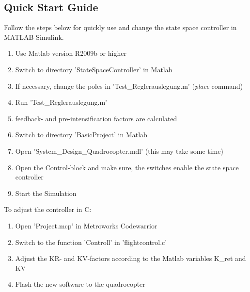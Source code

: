 \subsection{Quick Start Guide}\label{chapter_QSG}

Follow the steps below for quickly use and change the state space controller in MATLAB Simulink.

\begin{enumerate}
	\item Use Matlab version R2009b or higher
	\item Switch to directory 'StateSpaceController' in Matlab
	\item If necessary, change the poles in 'Test\_Reglerauslegung.m' (\textit{place} command)
	\item Run 'Test\_Reglerauslegung.m'
	\item feedback- and pre-intensification factors are calculated
	\item Switch to directory 'BasicProject' in Matlab
	\item Open 'System\_Design\_Quadrocopter.mdl' (this may take some time)
	\item Open the Control-block and make sure, the switches enable the state space controller
	\item Start the Simulation
\end{enumerate}

To adjust the controller in C:

\begin{enumerate}
	\item Open 'Project.mcp' in Metroworks Codewarrior
	\item Switch to the function 'Controll' in 'flightcontrol.c'
	\item Adjust the KR- and KV-factors according to the Matlab variables K\_ret and KV  
	\item Flash the new software to the quadrocopter
\end{enumerate}